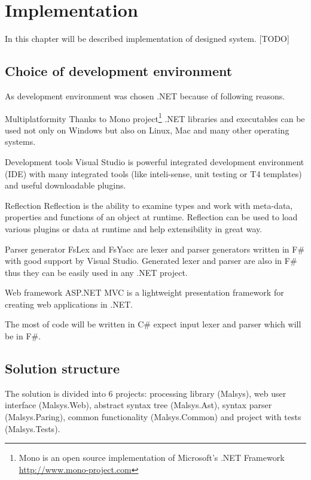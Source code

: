 
\chapter{Implementation}
\label{chap:implementation}

In this chapter will be described implementation of designed system.
[TODO]


\section{Choice of development environment}

As development environment was chosen .NET because of following reasons.

\begin{description*}
	\item[Multiplatformity]
		Thanks to Mono project\footnote{Mono is an open source implementation of Microsoft's .NET Framework \url{http://www.mono-project.com}}
			.NET libraries and executables can be used not only on Windows but also on Linux, Mac and many other operating systems.
	\item[Development tools]
		Visual Studio is powerful integrated development environment (IDE) with many integrated tools (like inteli-sense, unit testing or T4 templates) and useful downloadable plugins.
	\item[Reflection]
		Reflection is the ability to examine types and work with meta-data, properties and functions of an object at runtime.
		Reflection can be used to load various plugins or data at runtime and help extensibility in great way.
	\item[Parser generator]
		FsLex and FsYacc are lexer and parser generators written in F\# with good support by Visual Studio.
		Generated lexer and parser are also in F\# thus they can be easily used in any .NET project.
	\item[Web framework]
		ASP.NET MVC is a lightweight presentation framework for creating web applications in .NET.
\end{description*}

The most of code will be written in C\# expect input lexer and parser which will be in F\#. 


\section{Solution structure}

The solution is divided into 6 projects: \lsystem processing library (Malsys), web user interface (Malsys.Web), abstract syntax tree (Malsys.Ast), syntax parser (Malsys.Paring), common functionality (Malsys.Common) and project with tests (Malsys.Tests).


